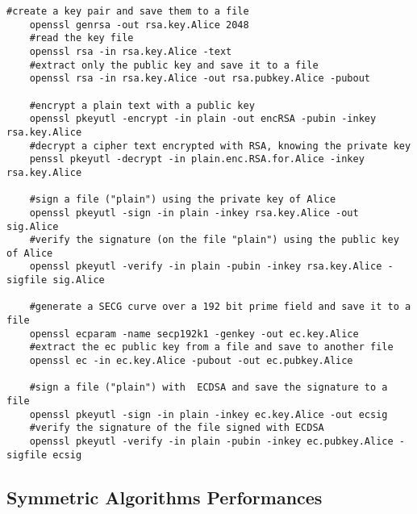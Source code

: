 \begin{lstlisting}[style=bashStyle]
	#create a key pair and save them to a file
	openssl genrsa -out rsa.key.Alice 2048 
	#read the key file
	openssl rsa -in rsa.key.Alice -text 
	#extract only the public key and save it to a file
	openssl rsa -in rsa.key.Alice -out rsa.pubkey.Alice -pubout

	#encrypt a plain text with a public key
	openssl pkeyutl -encrypt -in plain -out encRSA -pubin -inkey rsa.key.Alice 
	#decrypt a cipher text encrypted with RSA, knowing the private key
	penssl pkeyutl -decrypt -in plain.enc.RSA.for.Alice -inkey rsa.key.Alice

	#sign a file ("plain") using the private key of Alice
	openssl pkeyutl -sign -in plain -inkey rsa.key.Alice -out sig.Alice
	#verify the signature (on the file "plain") using the public key of Alice
	openssl pkeyutl -verify -in plain -pubin -inkey rsa.key.Alice -sigfile sig.Alice

	#generate a SECG curve over a 192 bit prime field and save it to a file
	openssl ecparam -name secp192k1 -genkey -out ec.key.Alice
	#extract the ec public key from a file and save to another file
	openssl ec -in ec.key.Alice -pubout -out ec.pubkey.Alice

	#sign a file ("plain") with  ECDSA and save the signature to a file
	openssl pkeyutl -sign -in plain -inkey ec.key.Alice -out ecsig
	#verify the signature of the file signed with ECDSA
	openssl pkeyutl -verify -in plain -pubin -inkey ec.pubkey.Alice -sigfile ecsig
\end{lstlisting}

\subsection*{Symmetric Algorithms Performances}

